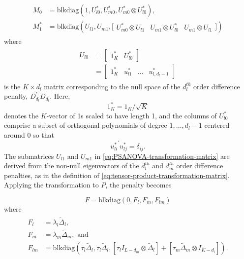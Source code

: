 \documentclass[12pt]{article}
\newcommand{\ms}{\scriptscriptstyle}
\theoremstyle{definition}
\begin{document}
\begin{align}
\begin{split} \label{eq:PSANOVA-transformation-matrix}
M_0 &= \mbox{blkdiag}\left(1,  U^*_{ l0},  U^*_{ m0}, U^*_{ m0} \otimes  U^*_{ l0} \right), \\
M_1^* &= \mbox{blkdiag}\left( U_{l1}, U_{m1}, \bigg[ \begin{array}{c|c|c} U^*_{ m0} \otimes U_{l1}  & U_{m1} \otimes  U^*_{\ms l0}  &  U_{m1} \otimes  U_{ l1} \end{array} \bigg] \right) 
\end{split}
\end{align} 
\noindent 
where
\begin{align} 
\begin{split}\label{eq:marginal-difference-penalty-null-basis}
U_{l0} &= [\begin{array}{c|c} 1_K^* & U_{l0}^*  \end{array}] \\
&= [\begin{array}{c|c|c|c} 1_K^* & u_{\ms l1}^* & \dots & u_{\ms l,d_{\ms l}-1}^* \end{array}]
\end{split}
\end{align}
\noindent
is the $K \times d_l$ matrix corresponding to the null space of the $d_l^{th}$ order difference penalty, $D_{\ms d_{\ms l}}^\prime D_{\ms d_{\ms l}}$. Here,
\[
1_K^*= 1_K/\sqrt{K}
\]
denotes the $K$-vector of 1s scaled to have length 1, and the columns of $U_{l0}^*$ comprise a subset of orthogonal polynomials of degree $1,\dots, d_l-1$ centered around 0 so that 
\[
{u_{\ms li}^*}^\prime u_{\ms lj}^*  = \delta_{ij}.
\]
The submatrices $U_{l1}$ and $U_{m1}$ in \ref{eq:PSANOVA-transformation-matrix} are derived from the non-null eigenvectors of the $d_l^{th}$ and $d_m^{th}$ order difference penalties, as in the definition of \ref{eq:tensor-product-transformation-matrix}. Applying the transformation to $P$, the penalty becomes

\begin{equation} \label{eq:PSANOVA-mm-penalty}
F = \mbox{blkdiag}\left( 0, F_l, F_m, F_{lm}  \right) 
\end{equation}
\noindent
where
\begin{align*}
\begin{split} 
F_l &= \lambda_l \tilde{\Delta}_l,\\
F_{\ms m} &= \lambda_m \tilde{\Delta}_m, \mbox{ and}\\
F_{\ms l \ms m} &= \mbox{blkdiag}\left( \tau_l \tilde{\Delta}_l, \tau_l \tilde{\Delta}_l, [ \tau_l I_{L-d_{\ms m}} \otimes \tilde{\Delta}_l ]+ [ \tau_m \tilde{\Delta}_m \otimes I_{K-d_{\ms l}}] \right).
\end{split}
\end{align*}
\end{document}
